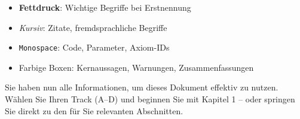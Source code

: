 \begin{itemize}
    \item \textbf{Fettdruck}: Wichtige Begriffe bei Erstnennung
    \item \textit{Kursiv}: Zitate, fremdsprachliche Begriffe
    \item \texttt{Monospace}: Code, Parameter, Axiom-IDs
    \item Farbige Boxen: Kernaussagen, Warnungen, Zusammenfassungen
\end{itemize}

\vspace{1em}
\begin{tcolorbox}[colback=green!5!white, colframe=green!75!black, title=Bereit?]
Sie haben nun alle Informationen, um dieses Dokument effektiv zu nutzen. Wählen Sie Ihren Track (A--D) und beginnen Sie mit Kapitel 1 -- oder springen Sie direkt zu den für Sie relevanten Abschnitten.
\end{tcolorbox}

\newpage

